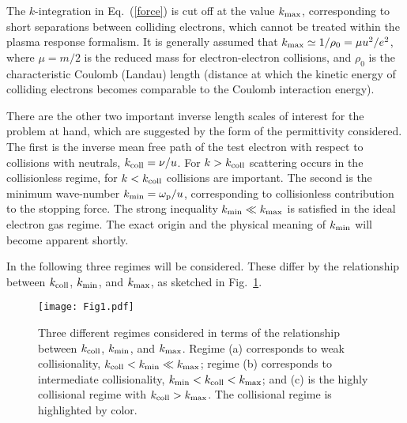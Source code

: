 \documentclass[twocolumn, 
  aps, prl,
  amsmath,amssymb,
  ]{revtex4-1}
\begin{document}
The $k$-integration in Eq.~(\ref{force}) is cut off at the value $k_{\rm max}$, corresponding to short separations between colliding electrons, which cannot be treated within the plasma response formalism. It is generally assumed that $k_{\rm max}\simeq 1/\rho_0=\mu u^2/e^2$, where $\mu=m/2$ is the reduced mass for electron-electron collisions, and $\rho_0$ is the characteristic Coulomb (Landau) length (distance at which the kinetic energy of colliding electrons becomes comparable to the Coulomb interaction energy). 

There are the other two important inverse length scales of interest for the problem at hand, which are suggested by the form of the permittivity considered. 
The first is the inverse mean free path of the test electron with respect to collisions with neutrals, $k_{\rm coll}=\nu/u$. For $k>k_{\rm coll}$ scattering occurs in the collisionless regime, for $k<k_{\rm coll}$ collisions are important. The second is the minimum wave-number $k_{\rm min}=\omega_{\rm p}/u$, corresponding to collisionless contribution to the stopping force. 
The strong inequality $k_{\rm min}\ll k_{\rm max}$ is satisfied in the ideal electron gas regime. The exact origin and the physical meaning of $k_{\rm min}$ will become apparent shortly.     
 
In the following three regimes will be considered. These differ by the relationship between $k_{\rm coll}$, $k_{\rm min}$, and $k_{\rm max}$, as sketched in Fig.~\ref{Fig1}. 

\begin{figure}
\texttt{[image: Fig1.pdf]}
\caption{Three different regimes considered in terms of the relationship between  $k_{\rm coll}$, $k_{\rm min}$, and $k_{\rm max}$. Regime (a) corresponds to weak collisionality, $k_{\rm coll}<k_{\rm min}\ll k_{\max}$; regime (b) corresponds to intermediate collisionality, $k_{\rm min}< k_{\rm coll}< k_{\rm max}$; and (c) is the highly collisional regime with $k_{\rm coll} > k_{\rm max}$. The collisional regime is highlighted by color.}
\label{Fig1}
\end{figure}
\end{document}
